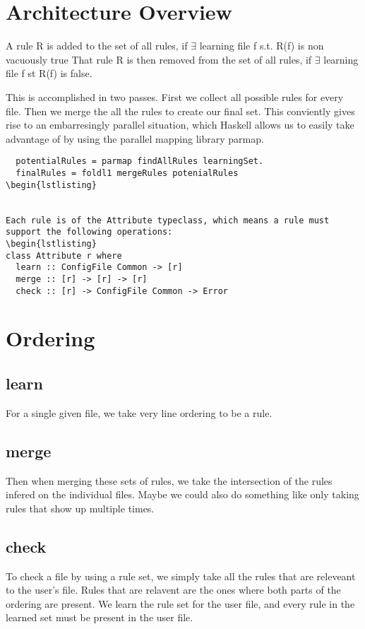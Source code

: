 
\section{Architecture Overview}




A rule R is added to the set of all rules,
  if $\exists$ learning file f s.t. R(f) is non vacuously true
That rule R is then removed from the set of all rules,
  if $\exists$ learning file f st R(f) is false.

This is accomplished in two passes.
First we collect all possible rules for every file.
Then we merge the all the rules to create our final set.
This conviently gives rise to an embarresingly parallel situation, which Haskell allows us to easily take advantage of by
  using the parallel mapping library parmap.

\begin{lstlisting}
  potentialRules = parmap findAllRules learningSet.
  finalRules = foldl1 mergeRules potenialRules
\begin{lstlisting}


Each rule is of the Attribute typeclass, which means a rule must support the following operations:
\begin{lstlisting}
class Attribute r where
  learn :: ConfigFile Common -> [r]
  merge :: [r] -> [r] -> [r] 
  check :: [r] -> ConfigFile Common -> Error
\end{lstlisting} 


\section{Ordering}
\subsection{learn}
  For a single given file, we take very line ordering to be a rule.
\subsection{merge}
  Then when merging these sets of rules, we take the intersection of the rules infered on the individual files.
  Maybe we could also do something like only taking rules that show up multiple times.
\subsection{check}
  To check a file by using a rule set, we simply take all the rules that are releveant to the user's file.
  Rules that are relavent are the ones where both parts of the ordering are present.
  We learn the rule set for the user file, and every rule in the learned set must be present in the user file.
